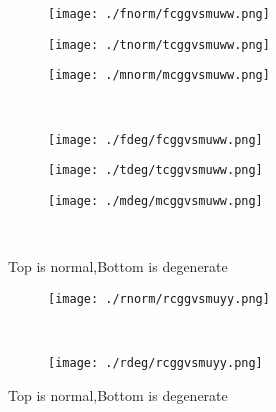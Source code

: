 \documentclass[aps,floats,floatfix,nofootinbib]{revtex4-1}
\begin{document}
\begin{center}
\begin{figure}
\begin{subfigure}{0.3\textwidth}
\texttt{[image: ./fnorm/fcggvsmuww.png]}
\label{}
\end{subfigure}
\begin{subfigure}{0.3\textwidth}
\texttt{[image: ./tnorm/tcggvsmuww.png]}
\label{}
\end{subfigure}
\begin{subfigure}{0.3\textwidth}
\texttt{[image: ./mnorm/mcggvsmuww.png]}
\label{}
\end{subfigure}\\
\begin{subfigure}{0.3\textwidth}
\texttt{[image: ./fdeg/fcggvsmuww.png]}
\label{}
\end{subfigure}
\begin{subfigure}{0.3\textwidth}
\texttt{[image: ./tdeg/tcggvsmuww.png]}
\label{}
\end{subfigure}
\begin{subfigure}{0.3\textwidth}
\texttt{[image: ./mdeg/mcggvsmuww.png]}
\label{}
\end{subfigure}\\
\caption{Top is normal,Bottom is degenerate}
\end{figure}
\end{center}

\begin{center}
\begin{figure}
\begin{subfigure}{0.95\textwidth}
\texttt{[image: ./rnorm/rcggvsmuyy.png]}
\label{}
\end{subfigure}\\
\begin{subfigure}{0.95\textwidth}
\texttt{[image: ./rdeg/rcggvsmuyy.png]}
\label{}
\end{subfigure}
\caption{Top is normal,Bottom is degenerate}
\end{figure}
\end{center}
\end{document}
